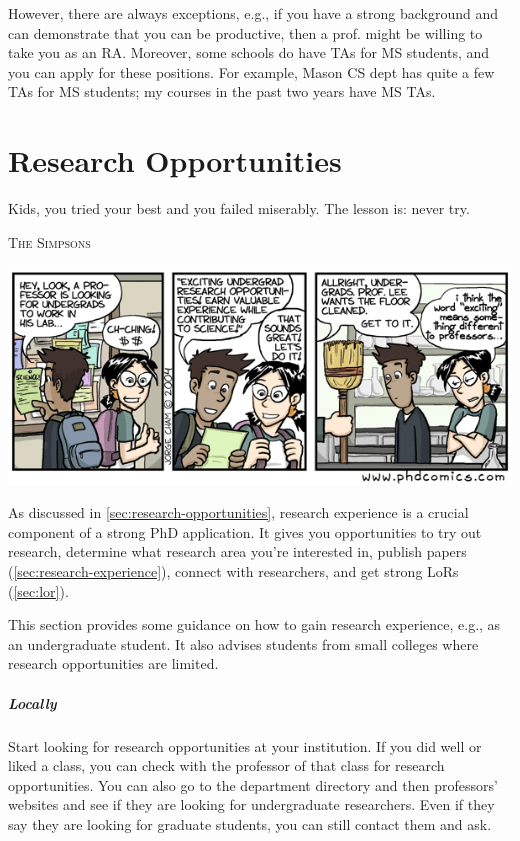 \documentclass[oneside,11pt,dvipsnames]{book}
\def\chapterinfo#1{%
  \addcontentsline{toc}{chapterinfo}{%
    \noexpand\numberline{}\color{black}{#1}}%
}
\begin{document}
However, there are always exceptions, e.g., if you have a strong background and can demonstrate that you can be productive, then a prof. might be willing to take you as an RA. Moreover, some schools do have TAs for MS students, and you can apply for these positions. For example, Mason CS dept has quite a few TAs for MS students; my courses in the past two years have MS TAs.

\chapter{Research Opportunities}\label{sec:research-opportunities}
\chapterinfo{How to get research experience as an undergrad.}

\epigraph{\vspace{-0.2in} Kids, you tried your best and you failed miserably. The lesson is: never try.}{\textsc{The Simpsons}}



\begin{center}
    \includegraphics[scale=0.5]{files/phd100404s.png}
  \end{center}

As discussed in \autoref{sec:research-opportunities}, research experience is a crucial component of a strong PhD application. It gives you opportunities to try out research, determine what research area you're interested in, publish papers (\autoref{sec:research-experience}), connect with researchers, and get strong LoRs (\autoref{sec:lor}).

 This section provides some guidance on how to gain research experience, e.g., as an undergraduate student.  It also advises students from small colleges where research opportunities are limited.

\paragraph{Locally} Start looking for research opportunities at your institution.
If you did well or liked a class, you can check with the professor of that class for research opportunities.
You can also go to the department directory and then professors' websites and see if they are looking for undergraduate researchers.
Even if they say they are looking for graduate students, you can still contact them and ask.
\end{document}
